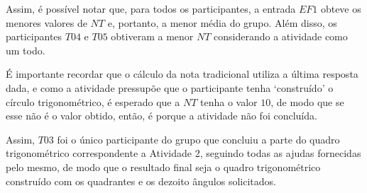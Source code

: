 Assim, é possível notar que, para todos os participantes, a entrada $EF1$ obteve os menores valores de $NT$ e, portanto, a menor média do grupo. Além disso, os participantes $T04$ e $T05$ obtiveram a menor $NT$ considerando a atividade como um todo.

É importante recordar que o cálculo da nota tradicional utiliza a última resposta dada, e como a atividade pressupõe que o participante tenha `construído' o círculo trigonométrico, é esperado que a $NT$ tenha o valor $10$, de modo que se esse não é o valor obtido, então, é porque a atividade não foi concluída.

Assim, $T03$ foi o único participante do grupo que concluiu a parte do quadro trigonométrico correspondente a Atividade 2, seguindo todas as ajudas fornecidas pelo mesmo, de modo que o resultado final seja o quadro trigonométrico construído com os quadrantes e os dezoito ângulos solicitados.


